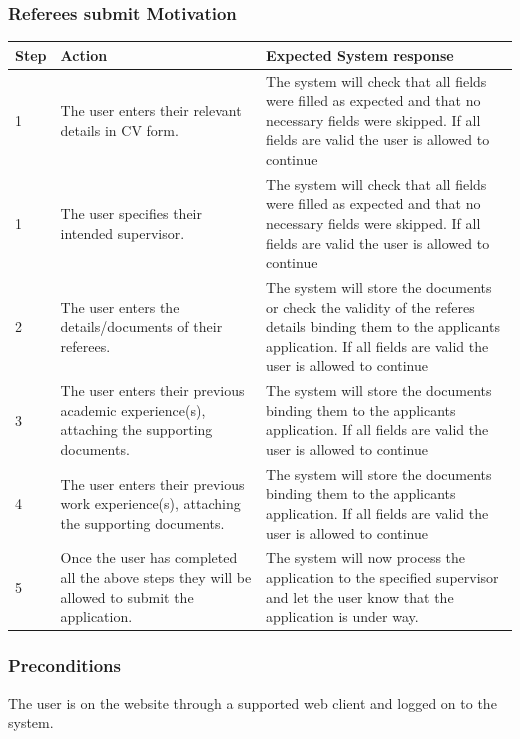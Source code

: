\documentclass[12pt]{article}
\begin{document}
\subsubsection{Referees submit Motivation}

\begin{center}
\begin{tabular}{|l|p{6cm}|p{8cm}|}
\hline
Step & Action & Expected System response \\
\hline
1 & The user enters their relevant details in CV form.  & The system will check that all fields were filled as expected and that no necessary fields were skipped. If all fields are valid the user is allowed to continue \\
\hline
1 & The user specifies their intended supervisor.  & The system will check that all fields were filled as expected and that no necessary fields were skipped. If all fields are valid the user is allowed to continue \\
\hline
2 & The user enters the details/documents of their referees.  & The system will store the documents or check the validity of the referes details binding them to the applicants application. If all fields are valid the user is allowed to continue \\
\hline
3 & The user enters their previous academic experience(s), attaching the supporting documents.  & The system will store the documents binding them to the applicants application. If all fields are valid the user is allowed to continue \\
\hline
4 & The user enters their previous work experience(s), attaching the supporting documents.  & The system will store the documents binding them to the applicants application. If all fields are valid the user is allowed to continue \\
5 & Once the user has completed all the above steps they will be allowed to submit the application.  & The system will now process the application to the specified supervisor and let the user know that the application is under way. \\
\hline
\end{tabular}
\end{center}

\subsubsection*{Preconditions}
The user is on the website through a supported web client and logged on to the system.
\end{document}
